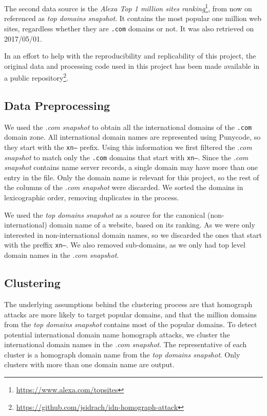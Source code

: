\documentclass[letterpaper,twocolumn,10pt]{article}
\begin{document}
The second data source is the \textit{Alexa Top 1 million sites ranking}\footnote{\url{https://www.alexa.com/topsites}}, from now on referenced as \textit{top domains snapshot}.
It contains the most popular one million web sites, regardless whether they are \texttt{.com} domains or not.
It was also retrieved on 2017/05/01.

In an effort to help with the reproducibility and replicability of this project, the original data and processing code used in this project has been made available in a public repository\footnote{\url{https://github.com/jsidrach/idn-homograph-attack}}.

\subsection{Data Preprocessing}
We used the \textit{.com snapshot} to obtain all the international domains of the \texttt{.com} domain zone.
All international domain names are represented using Punycode, so they start with the \texttt{xn--} prefix.
Using this information we first filtered the \textit{.com snapshot} to match only the \texttt{.com} domains that start with \texttt{xn--}.
Since the \textit{.com snapshot} contains name server records, a single domain may have more than one entry in the file.
Only the domain name is relevant for this project, so the rest of the columns of the \textit{.com snapshot} were discarded.
We sorted the domains in lexicographic order, removing duplicates in the process.

We used the \textit{top domains snapshot} as a source for the canonical (non-international) domain name of a website, based on its ranking.
As we were only interested in non-international domain names, so we discarded the ones that start with the preffix \texttt{xn--}.
We also removed sub-domains, as we only had top level domain names in the \textit{.com snapshot}.

\subsection{Clustering}
The underlying assumptions behind the clustering process are that homograph attacks are more likely to target popular domains, and that the million domains from the \textit{top domains snapshot} contains most of the popular domains.
To detect potential international domain name homograph attacks, we cluster the international domain names in the \textit{.com snapshot}.
The representative of each cluster is a homograph domain name from the \textit{top domains snapshot}.
Only clusters with more than one domain name are output.
\end{document}
